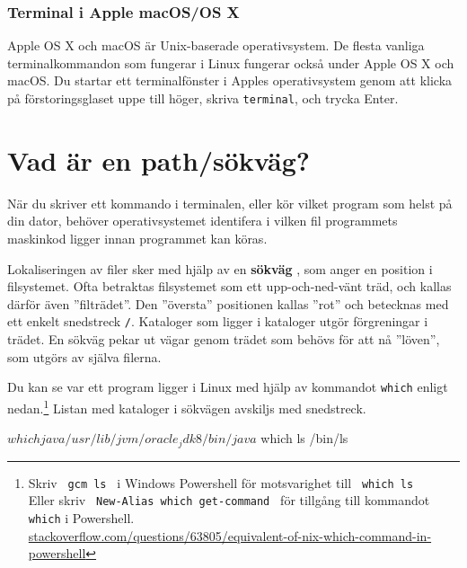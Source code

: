 



\subsubsection{Terminal i Apple macOS/OS X}


Apple OS X och macOS är Unix-baserade operativsystem. De flesta vanliga terminalkommandon som fungerar i Linux fungerar också under Apple OS X och macOS. Du startar ett terminalfönster i Apples operativsystem genom att klicka på förstoringsglaset uppe till höger, skriva \texttt{terminal}, och trycka Enter.

\section{Vad är en path/sökväg?}\label{terminal:path}

När du skriver ett kommando i terminalen, eller kör vilket program som helst på din dator, behöver operativsystemet identifera i vilken fil programmets maskinkod ligger innan programmet kan köras. 

Lokaliseringen av filer sker med hjälp av en \textbf{sökväg} , som anger en position i filsystemet. Ofta betraktas filsystemet som ett upp-och-ned-vänt träd, och kallas därför även ''filträdet''. Den ''översta'' positionen kallas ''rot''  och betecknas med ett enkelt snedstreck \texttt{/}. Kataloger som ligger i kataloger utgör förgreningar i trädet. En sökväg pekar ut vägar genom trädet som behövs för att nå ''löven'', som utgörs av själva filerna.

Du kan se var ett program ligger i Linux med hjälp av kommandot \texttt{which} enligt nedan.\footnote{Skriv \texttt{ gcm ls } i Windows Powershell för motsvarighet till \texttt{ which ls } \\ Eller skriv \texttt{ New-Alias which get-command } för tillgång till kommandot \texttt{which} i Powershell. \\ \href{http://stackoverflow.com/questions/63805/equivalent-of-nix-which-command-in-powershell}{stackoverflow.com/questions/63805/equivalent-of-nix-which-command-in-powershell}} Listan med kataloger i sökvägen avskiljs med snedstreck.
\begin{REPLnonum}
$ which java
/usr/lib/jvm/oracle_jdk8/bin/java
$ which ls
/bin/ls
\end{REPLnonum}

